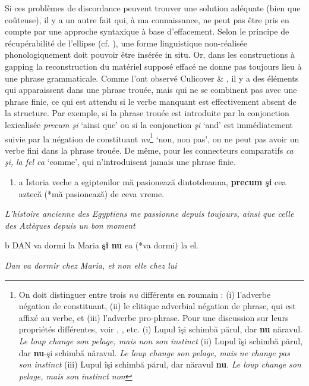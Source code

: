 Si ces problèmes de discordance peuvent trouver une solution adéquate (bien que coûteuse), il y a un autre fait qui, à ma connaissance, ne peut pas être pris en compte par une approche syntaxique à base d'effacement. Selon le principe de récupérabilité de l'ellipse (cf. \citet{Chomsky1964}), une forme linguistique non-réalisée phonologiquement doit pouvoir être insérée in situ. Or, dans les constructions à gapping la reconstruction du matériel supposé effacé ne donne pas toujours lieu à une phrase grammaticale. Comme l'ont observé Culicover \& \citet{Jackendoff2005}, il y a des éléments qui apparaissent dans une phrase trouée, mais qui ne se combinent pas avec une phrase finie, ce qui est attendu si le verbe manquant est effectivement absent de la structure. Par exemple, si la phrase trouée est introduite par la conjonction lexicalisée \textit{precum şi} `ainsi que' ou si la conjonction \textit{şi} `and' est immédiatement suivie par la négation de constituant \textit{nu}\footnote{On doit distinguer entre trois \textit{nu} différents en roumain : (i) l'adverbe négation de constituant, (ii) le clitique adverbial négation de phrase, qui est affixé au verbe, et (iii) l'adverbe pro-phrase. Pour une discussion sur leurs propriétés différentes, voir \citet{Barbu2004}, \citet{Ionescu2003}, etc. 
(i)  Lupul îşi schimbă părul, dar \textbf{nu} năravul.
  \textit{Le loup change son pelage, mais non son instinct}
(ii)  Lupul îşi schimbă părul, dar \textbf{nu}-şi schimbă năravul.
  \textit{Le loup change son pelage, mais ne change pas son instinct}
(iii)  Lupul îşi schimbă părul, dar năravul \textbf{nu}.
  \textit{Le loup change son pelage, mais son instinct non}} `non, non pas', on ne peut pas avoir un verbe fini dans la phrase trouée. De même, pour les connecteurs comparatifs\textit{ ca şi,} \textit{la fel ca} `comme', qui n'introduisent jamais une phrase finie. 


\begin{enumerate}
\item a  Istoria veche a egiptenilor mă pasionează dintotdeauna, \textbf{precum şi} cea aztecă (*mă pasionează) de ceva vreme.


\end{enumerate}
{\itshape
L'histoire ancienne des Egyptiens me passionne depuis toujours, ainsi que celle des Aztèques depuis un bon moment } 

  b  DAN va dormi la Maria \textbf{şi nu} ea (*va dormi) la el.

{\itshape
Dan va dormir chez Maria, et non elle chez lui}

